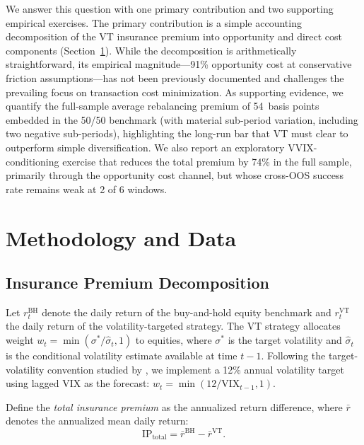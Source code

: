 \documentclass[12pt,a4paper]{article}
\begin{document}
We answer this question with one primary contribution and two supporting empirical exercises. The primary contribution is a simple accounting decomposition of the VT insurance premium into opportunity and direct cost components (Section~\ref{sec:method}). While the decomposition is arithmetically straightforward, its empirical magnitude---91\% opportunity cost at conservative friction assumptions---has not been previously documented and challenges the prevailing focus on transaction cost minimization. As supporting evidence, we quantify the full-sample average rebalancing premium of 54~basis points embedded in the 50/50 benchmark (with material sub-period variation, including two negative sub-periods), highlighting the long-run bar that VT must clear to outperform simple diversification. We also report an exploratory VVIX-conditioning exercise that reduces the total premium by 74\% in the full sample, primarily through the opportunity cost channel, but whose cross-OOS success rate remains weak at 2 of 6 windows.

\section{Methodology and Data}
\label{sec:method}

\subsection{Insurance Premium Decomposition}
\label{sec:decomp}

Let $r_t^{\text{BH}}$ denote the daily return of the buy-and-hold equity benchmark and $r_t^{\text{VT}}$ the daily return of the volatility-targeted strategy. The VT strategy allocates weight $w_t = \min(\sigma^*/\hat{\sigma}_t, 1)$ to equities, where $\sigma^*$ is the target volatility and $\hat{\sigma}_t$ is the conditional volatility estimate available at time $t-1$. Following the target-volatility convention studied by \citet{perchet2016}, we implement a 12\% annual volatility target using lagged VIX as the forecast: $w_t = \min(12/\text{VIX}_{t-1}, 1)$.

Define the \emph{total insurance premium} as the annualized return difference, where $\bar{r}$ denotes the annualized mean daily return:
\begin{equation}
\text{IP}_{\text{total}} = \bar{r}^{\text{BH}} - \bar{r}^{\text{VT}}.
\label{eq:ip_total}
\end{equation}
\end{document}

